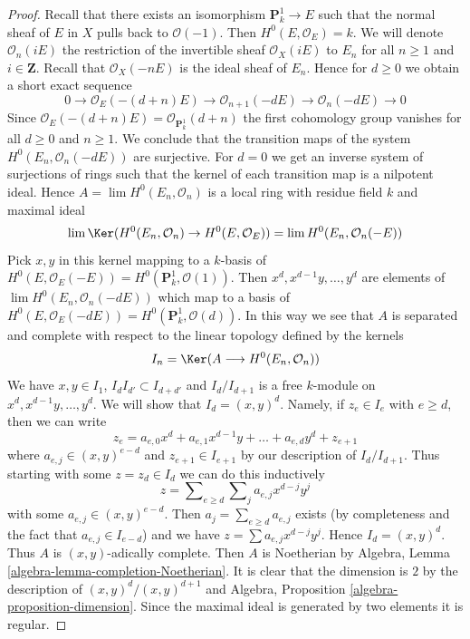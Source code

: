 \begin{proof}
Recall that there exists an isomorphism $\mathbf{P}^1_k \to E$
such that the normal sheaf of $E$ in $X$ pulls back to $\mathcal{O}(-1)$.
Then $H^0(E, \mathcal{O}_E) = k$.
We will denote $\mathcal{O}_n(iE)$ the restriction of the invertible
sheaf $\mathcal{O}_X(iE)$ to $E_n$ for all $n \geq 1$ and $i \in \mathbf{Z}$.
Recall that $\mathcal{O}_X(-nE)$ is the ideal sheaf of $E_n$. Hence
for $d \geq 0$ we obtain a short exact sequence
$$
0 \to \mathcal{O}_E(-(d + n)E) \to
\mathcal{O}_{n + 1}(-dE) \to
\mathcal{O}_n(-dE) \to 0
$$
Since $\mathcal{O}_E(-(d + n)E) = \mathcal{O}_{\mathbf{P}^1_k}(d + n)$
the first cohomology group vanishes for all $d \geq 0$ and $n \geq 1$.
We conclude that the transition maps of the system
$H^0(E_n, \mathcal{O}_n(-dE))$ are surjective. For $d = 0$
we get an inverse system of surjections of rings such that the
kernel of each transition map is a nilpotent ideal.
Hence $A = \lim H^0(E_n, \mathcal{O}_n)$ is a local ring
with residue field $k$ and maximal ideal
$$
\lim \Ker(H^0(E_n, \mathcal{O}_n) \to H^0(E, \mathcal{O}_E)) =
\lim H^0(E_n, \mathcal{O}_n(-E))
$$
Pick $x, y$ in this kernel mapping to a $k$-basis of
$H^0(E, \mathcal{O}_E(-E)) = H^0(\mathbf{P}^1_k, \mathcal{O}(1))$.
Then $x^d, x^{d - 1}y, \ldots, y^d$ are
elements of $\lim H^0(E_n, \mathcal{O}_n(-dE))$ which map to a basis
of $H^0(E, \mathcal{O}_E(-dE)) = H^0(\mathbf{P}^1_k, \mathcal{O}(d))$.
In this way we see that $A$ is separated and complete with respect
to the linear topology defined by the kernels
$$
I_n = \Ker(A \longrightarrow H^0(E_n, \mathcal{O}_n))
$$
We have $x, y \in I_1$, $I_d I_{d'} \subset I_{d + d'}$
and $I_d/I_{d + 1}$ is a free $k$-module on $x^d, x^{d - 1}y, \ldots, y^d$.
We will show that $I_d = (x, y)^d$. Namely, if $z_e \in I_e$ with
$e \geq d$, then we can write
$$
z_e = a_{e, 0} x^d + a_{e, 1} x^{d - 1}y + \ldots + a_{e, d}y^d + z_{e + 1}
$$
where $a_{e, j} \in (x, y)^{e - d}$ and $z_{e + 1} \in I_{e + 1}$
by our description of $I_d/I_{d + 1}$. Thus starting with some
$z = z_d \in I_d$ we can do this inductively
$$
z = \sum\nolimits_{e \geq d} \sum\nolimits_j a_{e, j} x^{d - j} y^j
$$
with some $a_{e, j} \in (x, y)^{e - d}$. Then $a_j = \sum_{e \geq d} a_{e, j}$
exists (by completeness and the fact that $a_{e, j} \in I_{e - d}$)
and we have $z = \sum a_{e, j} x^{d - j} y^j$.
Hence $I_d = (x, y)^d$.
Thus $A$ is $(x, y)$-adically complete. Then $A$ is
Noetherian by Algebra, Lemma \ref{algebra-lemma-completion-Noetherian}.
It is clear that the dimension is $2$ by the description
of $(x, y)^d/(x, y)^{d + 1}$ and
Algebra, Proposition \ref{algebra-proposition-dimension}.
Since the maximal ideal
is generated by two elements it is regular.
\end{proof}

